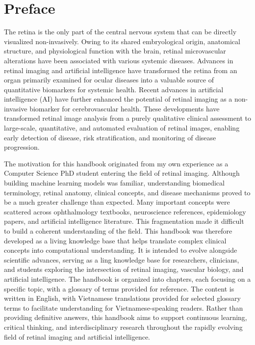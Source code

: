 \chapter*{Preface}


The retina is the only part of the central nervous system that can be directly visualized non-invasively. Owing to its shared embryological origin, anatomical structure, and physiological function with the brain, retinal microvascular alterations have been associated with various systemic diseases. Advances in retinal imaging and artificial intelligence have transformed the retina from an organ primarily examined for ocular diseases into a valuable source of quantitative biomarkers for systemic health. Recent advances in artificial intelligence (AI) have further enhanced the potential of retinal imaging as a non-invasive biomarker for cerebrovascular health. These developments have transformed retinal image analysis from a purely qualitative clinical assessment to large-scale, quantitative, and automated evaluation of retinal images, enabling early detection of disease, risk stratification, and monitoring of disease progression.

The motivation for this handbook originated from my own experience as a Computer Science PhD student entering the field of retinal imaging. Although building machine learning models was familiar, understanding biomedical terminology, retinal anatomy, clinical concepts, and disease mechanisms proved to be a much greater challenge than expected. Many important concepts were scattered across ophthalmology textbooks, neuroscience references, epidemiology papers, and artificial intelligence literature. This fragmentation made it difficult to build a coherent understanding of the field. This handbook was therefore developed as a living knowledge base that helps translate complex clinical concepts into computational understanding. It is intended to evolve alongside scientific advances, serving as a ling knowledge base for researchers, clinicians, and students exploring the intersection of retinal imaging, vascular biology, and artificial intelligence. The handbook is organized into chapters, each focusing on a specific topic, with a glossary of terms provided for reference. The content is written in English, with Vietnamese translations provided for selected glossary terms to facilitate understanding for Vietnamese-speaking readers. Rather than providing definitive answers, this handbook aims to support continuous learning, critical thinking, and interdisciplinary research throughout the rapidly evolving field of retinal imaging and artificial intelligence.